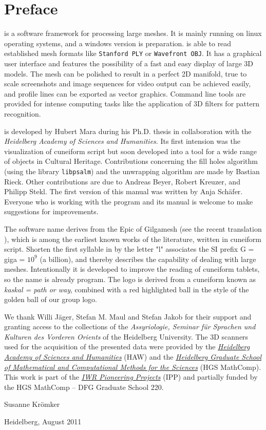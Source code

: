 \chapter*{Preface}

\GigaMesh is a software framework for processing large meshes. 
It is mainly running on linux operating systems, and a windows version is preparation. \GigaMesh is able to read established mesh formats like {\tt Stanford PLY} or {\tt Wavefront OBJ}. It has a graphical user interface and features the possibility of a fast and easy display of large 3D models. The mesh can be polished  to result in a perfect 2D manifold,  true to scale screenshots and  image sequences for video output can be achieved easily, and profile lines can be exported as vector graphics.
Command line tools are provided for intense computing tasks like the application of 3D filters for pattern recognition. 

\GigaMesh is developed by Hubert Mara during his Ph.D. thesis in collaboration with the {\em Heidelberg Academy of  Sciences and Humanities}. Its first intension was the visualization of cuneiform script but soon developed into a tool for a wide range of objects in Cultural Heritage. Contributions concerning the fill holes algorithm (using the library {\tt libpsalm})
and the unwrapping algorithm are made by Bastian Rieck. Other contributions are due to Andreas Beyer, Robert Kreuzer, and Philipp Stekl.
The first version of this manual was written by Anja Sch\"afer. Everyone who is working with the program and its manual is welcome to make suggestions for  improvements.

The software name \GigaMesh derives from the Epic of Gilgamesh (see the recent translation \cite{maul05a}), which is among the earliest known works of the literature, written in cuneiform script. Shorten the first syllable in \GigaMesh by the letter "l" associates the SI prefix G = giga = $10^9$ (a billion), and thereby describes the capability of dealing with large meshes. Intentionally it is developed to improve the reading of cuneiform tablets, so  the name is already program. The \GigaMesh logo is derived from a cuneiform known as {\em kaskal = path {\em or} way}, combined with a red highlighted ball in the style of the golden ball of our group logo.

We thank Willi J{\"a}ger, Stefan M. Maul and Stefan Jakob  for their support and granting access to the collections of the \emph{Assyriologie, Seminar f\"{u}r Sprachen und Kulturen des Vorderen Orients} of the Heidelberg University.
The 3D scanners used for the acquisition of the presented data were provided by the \emph{\href{http://www.haw.uni-heidelberg.de/}{Heidelberg Academy of  Sciences and Humanities}} (HAW) and
the \emph{\href{http://www.mathcomp.uni-heidelberg.de/}{Heidelberg Graduate School of Mathematical and Computational Methods for the Sciences}} (HGS MathComp).
This work is part of the \emph{\href{http://ipp.uni-hd.de/}{IWR Pioneering Projects}} (IPP) and partially funded by the HGS MathComp -- DFG Graduate School 220. 

\vspace{0.5 cm}

Susanne Kr\"omker


Heidelberg, August 2011
\newpage
\thispagestyle{empty}